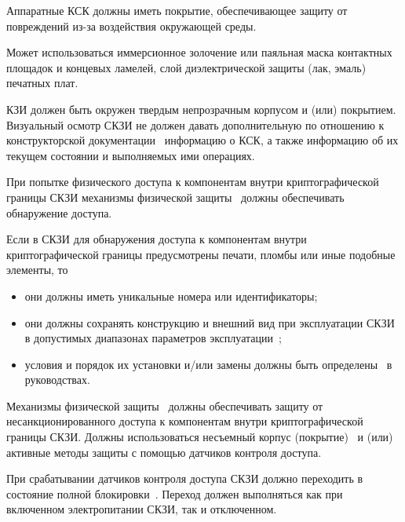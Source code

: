 \label{R.PS.Passivation} %
Аппаратные КСК должны иметь покрытие, обеспечивающее защиту от 
повреждений из-за воздействия окружающей среды. 

\begin{note*}
Может использоваться иммерсионное золочение или паяльная маска 
контактных площадок и концевых ламелей, слой диэлектрической защиты 
(лак, эмаль) печатных плат.
\end{note*}
\fi


\label{R.PS.Coating} %
КЗИ должен быть окружен твердым непрозрачным корпусом и (или) 
покрытием.
%
Визуальный осмотр СКЗИ не должен давать дополнительную по отношению 
к конструкторской документации~ информацию 
о КСК, а также информацию об их текущем состоянии и выполняемых ими  
операциях.


\label{R.PS.PassiveDetection} %
При попытке физического доступа к компонентам внутри 
криптографической границы СКЗИ механизмы физической защиты~ 
должны обеспечивать обнаружение доступа. 

\label{R.PS.PassiveDetectionId} %
Если в СКЗИ для обнаружения доступа к компонентам внутри 
криптографической границы предусмотрены печати, пломбы или иные подобные 
элементы, то 
\begin{itemize}
\item
они должны иметь уникальные номера или идентификаторы;
\item
они должны сохранять конструкцию и внешний вид при эксплуатации СКЗИ в допустимых 
диапазонах параметров эксплуатации~;
\item
условия и порядок их установки и/или замены
должны быть определены~ в руководствах.
\end{itemize}


\label{R.PS.ActiveDetectionSensor} %
Механизмы физической защиты~ должны обеспечивать 
защиту от несанкционированного доступа к компонентам внутри 
криптографической границы СКЗИ. 
%
Должны использоваться несъемный корпус (покрытие)~ 
и (или) активные методы защиты с помощью датчиков контроля доступа.

\label{R.PS.Erasing} %
При срабатывании датчиков контроля доступа СКЗИ должно 
переходить в состояние полной блокировки~.
%
Переход должен выполняться как при включенном электропитании 
СКЗИ, так и отключенном.


